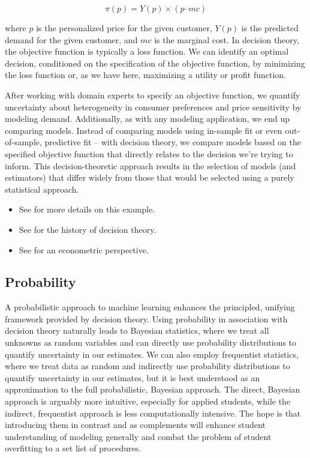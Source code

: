 \documentclass[
  12pt]{article}
\providecommand{\tightlist}{%
  \setlength{\itemsep}{0pt}\setlength{\parskip}{0pt}}
\begin{document}
\[
\pi(p) = Y(p) \times (p – mc)
\]

where \(p\) is the personalized price for the given customer, \(Y(p)\)
is the predicted demand for the given customer, and \(mc\) is the
marginal cost. In decision theory, the objective function is typically a
loss function. We can identify an optimal decision, conditioned on the
specification of the objective function, by minimizing the loss function
or, as we have here, maximizing a utility or profit function.

After working with domain experts to specify an objective function, we
quantify uncertainty about heterogeneity in consumer preferences and
price sensitivity by modeling demand. Additionally, as with any modeling
application, we end up comparing models. Instead of comparing models
using in-sample fit or even out-of-sample, predictive fit -- with
decision theory, we compare models based on the specified objective
function that directly relates to the decision we're trying to inform.
This decision-theoretic approach results in the selection of models (and
estimators) that differ widely from those that would be selected using a
purely statistical approach.

\begin{itemize}
\tightlist
\item
  See \citet{smith_optimal_2023} for more details on this example.
\item
  See \citet{giocoli_wald_2013} for the history of decision theory.
\item
  See \citet{kennedy_teaching_1998} for an econometric perspective.
\end{itemize}

\subsection{Probability}\label{probability}

A probabilistic approach to machine learning enhances the principled,
unifying framework provided by decision theory. Using probability in
association with decision theory naturally leads to Bayesian statistics,
where we treat all unknowns as random variables and can directly use
probability distributions to quantify uncertainty in our estimates. We
can also employ frequentist statistics, where we treat data as random
and indirectly use probability distributions to quantify uncertainty in
our estimates, but it is best understood as an approximation to the full
probabilistic, Bayesian approach. The direct, Bayesian approach is
arguably more intuitive, especially for applied students, while the
indirect, frequentist approach is less computationally intensive. The
hope is that introducing them in contrast and as complements will
enhance student understanding of modeling generally and combat the
problem of student overfitting to a set list of procedures.
\end{document}
